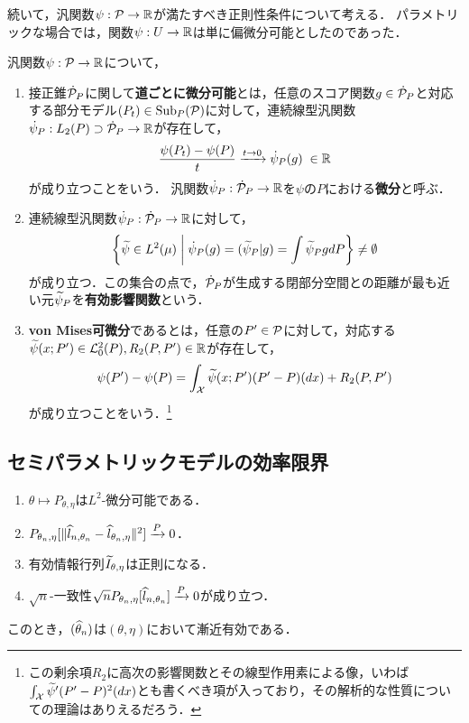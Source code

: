 \documentclass[uplatex, dvipdfmx]{jsarticle}
\newcommand{\Sub}{\mathrm{Sub}}
\begin{document}
続いて，汎関数$\psi:\P\to\R$が満たすべき正則性条件について考える．
パラメトリックな場合では，関数$\psi:U\to\R$は単に偏微分可能としたのであった．

\begin{definition}
    汎関数$\psi:\P\to\R$について，
    \begin{enumerate}
        \item 接正錐$\dot{\P}_P$に関して\textbf{道ごとに微分可能}とは，任意のスコア関数$g\in\dot{\P}_P$と対応する部分モデル$(P_t)\in\Sub_P(\P)$に対して，連続線型汎関数$\dot{\psi}_P:L_2(P)\supset\dot{\P}_P\to\R$が存在して，
        \[\frac{\psi(P_t)-\psi(P)}{t}\xrightarrow{t\to0}\dot{\psi}_P(g)\;\in\R\]
        が成り立つことをいう．
        汎関数$\dot{\psi}_P:\dot{\P}_P\to\R$を$\psi$の$P$における\textbf{微分}と呼ぶ．
        \item 連続線型汎関数$\dot{\psi}_P:\dot{\P}_P\to\R$に対して，
        \[\Brace{\wt{\psi}\in L^2(\mu)\;\middle|\;\dot{\psi}_P(g)=(\wt{\psi}_P|g)=\int\wt{\psi}_PgdP}\ne\emptyset\]
        が成り立つ．この集合の点で，$\dot{\P}_P$が生成する閉部分空間との距離が最も近い元$\wt{\psi}_P$を\textbf{有効影響関数}という．
        \item \textbf{von Mises可微分}であるとは，任意の$P'\in\P$に対して，対応する$\wt{\psi}(x;P')\in\L^2_0(P),R_2(P,P')\in\R$が存在して，
        \[\psi(P')-\psi(P)=\int_\X\wt{\psi}(x;P')(P'-P)(dx)+R_2(P,P')\]
        が成り立つことをいう．\footnote{この剰余項$R_2$に高次の影響関数とその線型作用素による像，いわば$\int_\X\wt{\psi}'(P'-P)^2(dx)$とも書くべき項が入っており，その解析的な性質についての理論はありえるだろう．}
    \end{enumerate}
\end{definition}

\subsection{セミパラメトリックモデルの効率限界}

\begin{theorem}
    \begin{enumerate}[({S}1)]
        \item $\theta\mapsto P_{\theta,\eta}$は$L^2$-微分可能である．
        \item $P_{\theta_n,\eta}[\norm{\wh{l}_{n,\theta_n}-\wh{l}_{\theta_n,\eta}}^2]\xrightarrow{P}0$．
        \item 有効情報行列$\wt{I}_{\theta,\eta}$は正則になる．
        \item $\sqrt{n}$-一致性$\sqrt{n}P_{\theta_n,\eta}[\wh{l}_{n,\theta_n}]\xrightarrow{P}0$が成り立つ．
    \end{enumerate}
    このとき，$(\wh{\theta}_n)$は$(\theta,\eta)$において漸近有効である．
\end{theorem}
\end{document}
